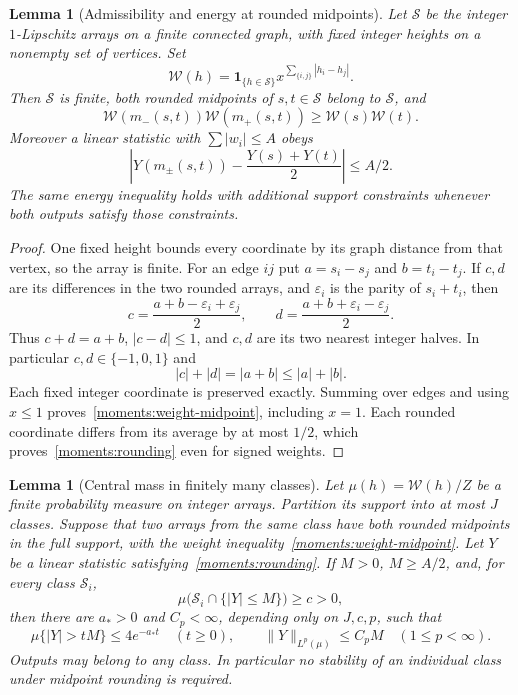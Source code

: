 \documentclass[11pt]{article}
\newcommand{\ind}{\mathbf 1}
\newtheorem{lemma}[theorem]{Lemma}
\theoremstyle{definition}
\theoremstyle{remark}
\numberwithin{equation}{section}
\begin{document}
\begin{lemma}[Admissibility and energy at rounded midpoints]
\label{moments:weighted-midpoints}
Let $\mathcal S$ be the integer $1$-Lipschitz arrays on a finite
connected graph, with fixed integer heights on a nonempty set of
vertices.  Set
\[
 \mathcal W(h)=\ind_{\{h\in\mathcal S\}}
       x^{\sum_{\{i,j\}}|h_i-h_j|}.
\]
Then $\mathcal S$ is finite, both rounded midpoints of $s,t\in\mathcal S$
belong to $\mathcal S$, and
\begin{equation}\label{moments:weight-midpoint}
 \mathcal W(m_-(s,t))\mathcal W(m_+(s,t))\geq \mathcal W(s)\mathcal W(t).
\end{equation}
Moreover a linear statistic with $\sum|w_i|\leq A$ obeys
\begin{equation}\label{moments:rounding}
 \left|Y(m_\pm(s,t))-\frac{Y(s)+Y(t)}2\right|\leq A/2.
\end{equation}
The same energy inequality holds with additional support constraints
whenever both outputs satisfy those constraints.
\end{lemma}

\begin{proof}
One fixed height bounds every coordinate by its graph distance from
that vertex, so the array is finite.  For an edge $ij$ put
$a=s_i-s_j$ and $b=t_i-t_j$.  If $c,d$ are its differences in the two
rounded arrays, and $\varepsilon_i$ is the parity of $s_i+t_i$, then
\[
 c=\frac{a+b-\varepsilon_i+\varepsilon_j}{2},\qquad
 d=\frac{a+b+\varepsilon_i-\varepsilon_j}{2}.
\]
Thus $c+d=a+b$, $|c-d|\leq1$, and $c,d$ are its two nearest integer
halves.  In particular $c,d\in\{-1,0,1\}$ and
\[
 |c|+|d|=|a+b|\leq|a|+|b|.
\]
Each fixed integer coordinate is preserved exactly.  Summing over edges
and using $x\leq1$ proves~\eqref{moments:weight-midpoint}, including
$x=1$.  Each rounded coordinate differs from its average by at most
$1/2$, which proves~\eqref{moments:rounding} even for signed weights.
\end{proof}

\begin{lemma}[Central mass in finitely many classes]
\label{lem:midpoint-amplification}
Let $\mu(h)=\mathcal W(h)/Z$ be a finite probability measure on integer arrays.
Partition its support into at most $J$ classes.  Suppose that two arrays
from the same class have both rounded midpoints in the full support,
with the weight inequality~\eqref{moments:weight-midpoint}.  Let $Y$ be
a linear statistic satisfying~\eqref{moments:rounding}.  If $M>0$,
$M\geq A/2$, and, for every class $\mathcal S_i$,
\begin{equation}\label{moments:class-central}
 \mu\bigl(\mathcal S_i\cap\{|Y|\leq M\}\bigr)\geq c>0,
\end{equation}
then there are $a_*>0$ and $C_p<\infty$, depending only on $J,c,p$, such
that
\begin{equation}\label{moments:amplification}
 \mu\{|Y|>tM\}\leq4e^{-a_*t}\quad(t\geq0),
 \qquad \|Y\|_{L^p(\mu)}\leq C_pM\quad(1\leq p<\infty).
\end{equation}
Outputs may belong to any class.  In particular no stability of an
individual class under midpoint rounding is required.
\end{lemma}
\end{document}
